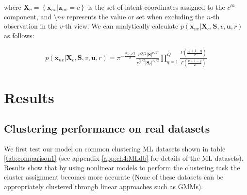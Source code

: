 \documentclass[]{article}
\newcommand{\Scluster}{\mathbf{S}}
\newcommand{\setX}{\mathbf{X}}
\newcommand{\obspv}{\mathbf{x}_{nv}}
\begin{document}
where $\setX_c = \left\{\obspv|\mathbf{z}_{nv}=c\right\}$ is the set of latent coordinates
assigned to the $c^{th}$ component, and $\setminus{nv}$ represents
the value or set when excluding the $n$-th observation in the $v$-th view. We can analytically calculate $p\left(\obspv|\setX_c, \Scluster,v,\mathbf{u},r\right)$  as follows:

\begin{align*}
p\left(\obspv|\setX_c, \Scluster,v,\mathbf{u},r\right) = \pi^{-\frac{N_{vc\setminus n}Q}{2}}\frac{r^{Q/2}|\Scluster|^{\nu/2}}{r_c^{Q/2}|\Scluster_c|^{\nu_c/2}}\prod_{q=1}^{Q}\frac{\Gamma\left(\frac{\nu_c + 1 -q}{2}\right)}{\Gamma\left(\frac{\nu + 1 -q}{2}\right)}
\end{align*}


%
%


\section{Results}

\subsection{Clustering performance on real datasets}

We first test our model on common clustering ML datasets shown in table \ref{tab:comparison1} (see appendix \ref{app:ch4:MLdb} for details of the ML datasets). Results show that by using nonlinear models to perform the clustering task the cluster assignment becomes more accurate (None of these
datasets can be appropriately clustered through linear approaches such as GMMs).

\begin{table}[ht!]
	\centering
	\caption{Average Rand index for evaluating clustering performance.}
	\label{tab:comparison1}
\end{table}
\end{document}
